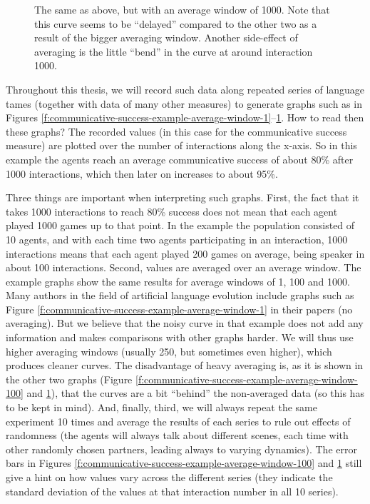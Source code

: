 \begin{figure}[p]
  \caption{The same as above, but with an average window of 1000. Note
    that this curve seems to be ``delayed'' compared to the other two
    as a result of the bigger averaging window. Another side-effect of
    averaging is the little ``bend'' in the curve at around
    interaction 1000.}
  \label{f:communicative-success-example-average-window-1000}
\end{figure}
\stopfiguregroup

\noindent Throughout this thesis, we will record such data along
repeated series of language tames (together with data of many other
measures) to generate graphs such as in Figures
\ref{f:communicative-success-example-average-window-1}--\ref{f:communicative-success-example-average-window-1000}. How
to read then these graphs? The recorded values (in this case for the
communicative success measure) are plotted over the number of
interactions along the x-axis. So in this example the agents reach an
average communicative success of about 80\% after 1000 interactions,
which then later on increases to about 95\%.

Three things are important when interpreting such graphs. First, the
fact that it takes 1000 interactions to reach 80\% success does not
mean that each agent played 1000 games up to that point. In the
example the population consisted of 10 agents, and with each time two
agents participating in an interaction, 1000 interactions means that
each agent played 200 games on average, being speaker in about 100
interactions. Second, values are averaged over an average window. The
example graphs show the same results for average windows of 1, 100 and
1000. Many authors in the field of artificial language evolution
include graphs such as Figure
\ref{f:communicative-success-example-average-window-1} in their papers
(no averaging). But we believe that the noisy curve in that example
does not add any information and makes comparisons with other graphs
harder. We will thus use higher averaging windows (usually 250, but
sometimes even higher), which produces cleaner curves. The
disadvantage of heavy averaging is, as it is shown in the other two
graphs (Figure
\ref{f:communicative-success-example-average-window-100} and
\ref{f:communicative-success-example-average-window-1000}), that the
curves are a bit ``behind'' the non-averaged data (so this has to be
kept in mind). And, finally, third, we will always repeat the same
experiment 10 times and average the results of each series to rule out
effects of randomness (the agents will always talk about different
scenes, each time with other randomly chosen partners, leading always
to varying dynamics). The error bars in Figures
\ref{f:communicative-success-example-average-window-100} and
\ref{f:communicative-success-example-average-window-1000} still give a
hint on how values vary across the different series (they indicate the
standard deviation of the values at that interaction number in all 10
series).

